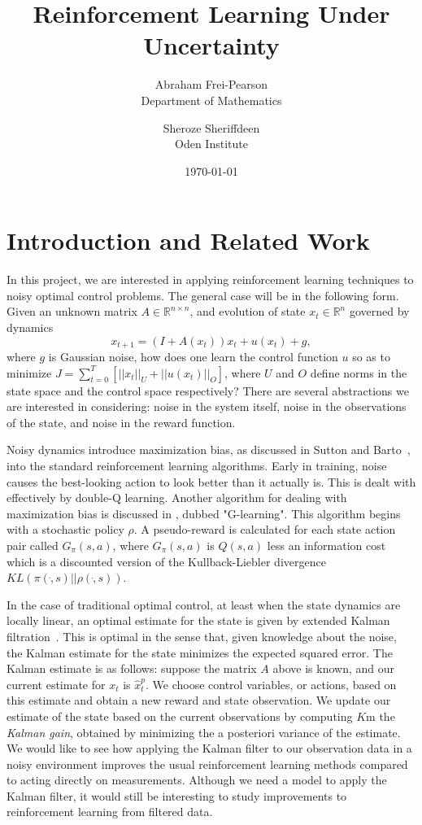 \documentclass{article}
\title{Reinforcement Learning Under Uncertainty}
\author{Abraham Frei-Pearson \\
	Department of Mathematics  \\
	\and 
	Sheroze Sheriffdeen \\
	Oden Institute \\
	}
\date{\today}
\begin{document}
\maketitle
\section{Introduction and Related Work}
In this project, we are interested in applying reinforcement learning techniques to noisy optimal control problems. The general case will be in the following form. Given an unknown matrix $A \in \mathbb{R}^{n \times n}$, and evolution of state $x_t \in \mathbb R^n$ governed by dynamics
\[
    x_{t+1} = (I + A(x_t)) x_t + u(x_t) + g,
\]
where $g$ is Gaussian noise, how does one learn the control function $u$ so as to minimize $J = \sum_{t=0}^{T} \left[ || x_t ||_U + || u(x_t)||_O \right]$, where $U$ and $O$ define norms in the state space and the control space respectively? There are several abstractions we are interested in considering: noise in the system itself, noise in the observations of the state, and noise in the reward function. 

Noisy dynamics introduce maximization bias, as discussed in Sutton and Barto~\cite{suttonAndBarto}, into the standard reinforcement learning algorithms. Early in training, noise causes the best-looking action to look better than it actually is. This is dealt with effectively by double-Q learning. Another algorithm for dealing with maximization bias is discussed in \cite{foxPakmanTishby}, dubbed "G-learning". This algorithm begins with a stochastic policy $\rho$. A pseudo-reward is calculated for each state action pair called $G_\pi(s,a)$, where $G_\pi(s,a)$ is $Q(s,a)$ less an information cost which is a discounted version of the Kullback-Liebler divergence $KL(\pi( \dot , s) || \rho( \dot , s))$.

In the case of traditional optimal control, at least when the state dynamics are locally linear, an optimal estimate for the state is given by extended Kalman filtration~\cite{welchBishop}. This is optimal in the sense that, given knowledge about the noise, the Kalman estimate for the state minimizes the expected squared error. The Kalman estimate is as follows: suppose the matrix $A$ above is known, and our current estimate for $x_t$ is $\hat x_t^p$. We choose control variables, or actions, based on this estimate and obtain a new reward and state observation. We update our estimate of the state based on the current observations by computing $K$m the {\em Kalman gain}, obtained by minimizing the a posteriori variance of the estimate. We would like to see how applying the Kalman filter to our observation data in a noisy environment improves the usual reinforcement learning methods compared to acting directly on measurements. Although we need a model to apply the Kalman filter, it would still be interesting to study improvements to reinforcement learning from filtered data. 
\end{document}

